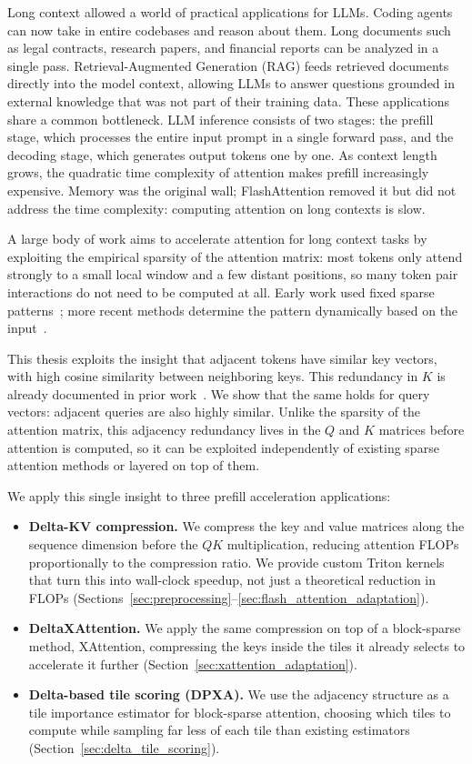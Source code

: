 Long context allowed a world of practical applications for LLMs. Coding agents can now take in entire codebases and reason about them. Long documents such as legal contracts, research papers, and financial reports can be analyzed in a single pass. Retrieval-Augmented Generation (RAG) feeds retrieved documents directly into the model context, allowing LLMs to answer questions grounded in external knowledge that was not part of their training data. These applications share a common bottleneck.
LLM inference consists of two stages: the prefill stage, which processes the entire input prompt in a single forward pass, and the decoding stage, which generates output tokens one by one.
As context length grows, the quadratic time complexity of attention makes prefill increasingly expensive.
Memory was the original wall; FlashAttention removed it but did not address the time complexity: computing attention on long contexts is slow.

A large body of work aims to accelerate attention for long context tasks by exploiting the empirical sparsity of the attention matrix: most tokens only attend strongly to a small local window and a few distant positions, so many token pair interactions do not need to be computed at all.
Early work used fixed sparse patterns~\citep{child2019generating}; more recent methods determine the pattern dynamically based on the input~\citep{jiang2024minference, lai2025flexprefill, xu2025xattention}.

This thesis exploits the insight that adjacent tokens have similar key vectors, with high cosine similarity between neighboring keys. This redundancy in $K$ is already documented in prior work~\citep{wang2024kvmerger, qi2024deltallm}. We show that the same holds for query vectors: adjacent queries are also highly similar. Unlike the sparsity of the attention matrix, this adjacency redundancy lives in the $Q$ and $K$ matrices before attention is computed, so it can be exploited independently of existing sparse attention methods or layered on top of them.

We apply this single insight to three prefill acceleration applications:
\begin{itemize}
    \item \textbf{Delta-KV compression.} We compress the key and value matrices along the sequence dimension before the $QK$ multiplication, reducing attention FLOPs proportionally to the compression ratio. We provide custom Triton kernels that turn this into wall-clock speedup, not just a theoretical reduction in FLOPs (Sections~\ref{sec:preprocessing}--\ref{sec:flash_attention_adaptation}).
    \item \textbf{DeltaXAttention.} We apply the same compression on top of a block-sparse method, XAttention, compressing the keys inside the tiles it already selects to accelerate it further (Section~\ref{sec:xattention_adaptation}).
    \item \textbf{Delta-based tile scoring (DPXA).} We use the adjacency structure as a tile importance estimator for block-sparse attention, choosing which tiles to compute while sampling far less of each tile than existing estimators (Section~\ref{sec:delta_tile_scoring}).
\end{itemize}

